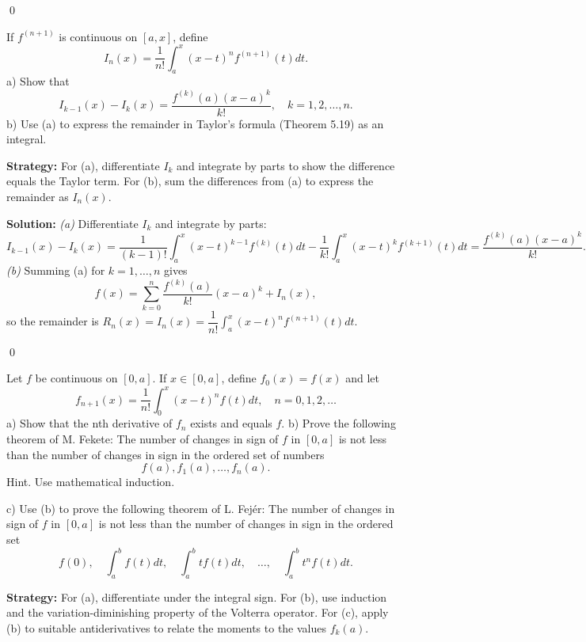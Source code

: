 \qed
\begin{problembox}
\begin{problemstatement}
If $f^{(n+1)}$ is continuous on $[a, x]$, define 
\[I_n(x) = \frac{1}{n!} \int_a^x (x - t)^n f^{(n+1)}(t) dt.\]
a) Show that 
\[I_{k-1}(x) - I_k(x) = \frac{f^{(k)}(a)(x - a)^k}{k!}, \quad k = 1, 2, \ldots, n.\]
b) Use (a) to express the remainder in Taylor's formula (Theorem 5.19) as an integral.
\end{problemstatement}
\end{problembox}

\noindent\textbf{Strategy:} For (a), differentiate $I_k$ and integrate by parts to show the difference equals the Taylor term. For (b), sum the differences from (a) to express the remainder as $I_n(x)$.

\bigskip\noindent\textbf{Solution:}
\textit{(a)} Differentiate $I_k$ and integrate by parts:
\[I_{k-1}(x)-I_k(x)=\frac{1}{(k-1)!}\int_a^x (x-t)^{k-1} f^{(k)}(t)dt-\frac{1}{k!}\int_a^x (x-t)^k f^{(k+1)}(t)dt=\frac{f^{(k)}(a)(x-a)^k}{k!}.
\]
\textit{(b)} Summing (a) for $k=1,\dots,n$ gives
\[f(x)=\sum_{k=0}^n \frac{f^{(k)}(a)}{k!}(x-a)^k+I_n(x),\]
so the remainder is $R_n(x)=I_n(x)=\dfrac{1}{n!}\int_a^x (x-t)^n f^{(n+1)}(t)dt$.




\qed
\begin{problembox}
\begin{problemstatement}
Let $f$ be continuous on $[0, a]$. If $x \in [0, a]$, define $f_0(x) = f(x)$ and let 
\[f_{n+1}(x) = \frac{1}{n!} \int_0^x (x - t)^n f(t) dt, \quad n = 0, 1, 2, \ldots\]
a) Show that the nth derivative of $f_n$ exists and equals $f$.
b) Prove the following theorem of M. Fekete: The number of changes in sign of $f$ in $[0, a]$ is not less than the number of changes in sign in the ordered set of numbers 
\[f(a), f_1(a), \ldots, f_n(a).\]
Hint. Use mathematical induction.

c) Use (b) to prove the following theorem of L. Fejér: The number of changes in sign of $f$ in $[0, a]$ is not less than the number of changes in sign in the ordered set
\[f(0), \quad \int_{a}^{b} f(t) dt, \quad \int_{a}^{b} t f(t) dt, \quad \ldots, \quad \int_{a}^{b} t^{n} f(t) dt.\]
\end{problemstatement}
\end{problembox}

\noindent\textbf{Strategy:} For (a), differentiate under the integral sign. For (b), use induction and the variation-diminishing property of the Volterra operator. For (c), apply (b) to suitable antiderivatives to relate the moments to the values $f_k(a)$.

